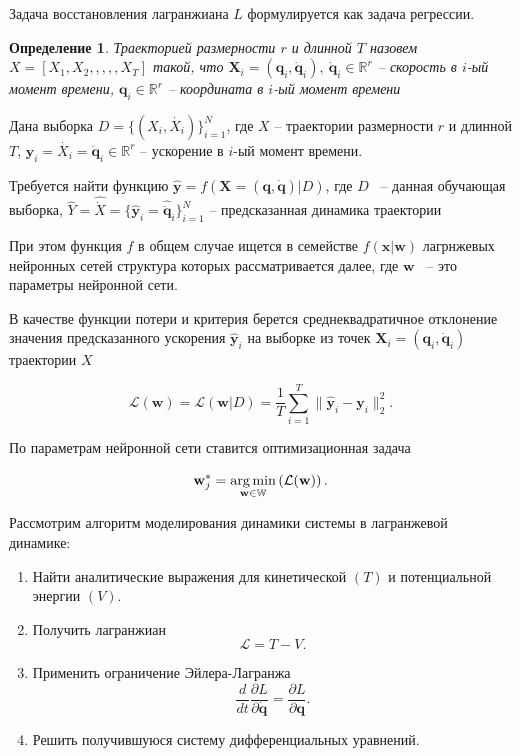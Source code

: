 \documentclass[12pt, twoside]{article}
\newtheorem{definition}{Определение}
\begin{document}
Задача восстановления лагранжиана $L$ формулируется как задача регрессии.

\begin{definition} \label{definition:trajectory}
Траекторией размерности $r$ и длинной $T$ назовем $X = [X_1, X_2, ,,,, X_T]$ такой, что
$\mathbf{X}_i = (\mathbf{q}_i, \mathbf{\dot{q}}_i),\ \mathbf{\dot{q}}_i \in \mathbb{R}^r$ -- скорость в $i$-ый момент времени, $\mathbf{q}_i \in \mathbb{R}^r$ -- координата в $i$-ый момент времени
\end{definition}

Дана выборка
$D = \{(X_i, \dot{X_i})\}_{i=1}^N$, где $X$ -- траектории размерности $r$ и длинной $T$, $\mathbf{y}_i = \dot{X_i} = \ddot{\mathbf{q}}_i \in \mathbb{R}^r$ -- ускорение в $i$-ый момент времени.

Требуется найти функцию $\hat{\mathbf{y}}  = f(\mathbf{X} = (\mathbf{q}, \mathbf{\dot{q}}) | D)$, где $D$ ~-- данная обучающая выборка, $\hat{Y} =\hat{\dot{X}} = \{\hat{\mathbf{y}}_i = \hat{\ddot{\mathbf{q}}}_i\}_{i=1}^N$ -- предсказанная динамика траектории

При этом функция $f$ в общем случае ищется в семействе $f(\mathbf{x}|\mathbf{w})$ лагрнжевых нейронных сетей структура которых рассматривается далее, где $\mathbf{w}$ ~-- это параметры нейронной сети.

В качестве функции потери и критерия берется среднеквадратичное отклонение значения предсказанного ускорения $\hat{\mathbf{y}}_i$ на выборке из точек $\mathbf{X}_i = (\mathbf{q}_i, \mathbf{\dot{q}}_i)$ траектории $X$

\begin{equation}
 \mathcal{L}(\textbf{w}) = \mathcal{L}(\mathbf{w} | D) = \frac{1}{T}\sum_{i=1}^{T} \| \hat{\mathbf{y}}_i - \mathbf{y}_i \|_2^2.
\end{equation}



По параметрам нейронной сети ставится оптимизационная задача

\begin{equation} 
\label{eq:opt_task}
\textbf{w}_j^* = \argmin_{\mathbf{w} \in \mathbb{W}} \left( \mathcal{L}(\textbf{w}) \right). 
\end{equation}


Рассмотрим алгоритм моделирования динамики системы в лагранжевой динамике:
\begin{enumerate}
	\item Найти аналитические выражения для кинетической $(T)$ и потенциальной энергии $(V)$.
	\item Получить лагранжиан \[\mathcal{L} = T - V .\]
	\item Применить ограничение Эйлера-Лагранжа \[\frac{d}{d t} \frac{\partial L}{\partial \mathbf{\dot{q}}} =\frac{\partial L}{\partial \mathbf{q}}.\]
	\item Решить получившуюся систему дифференциальных уравнений.
\end{enumerate}
\end{document}
